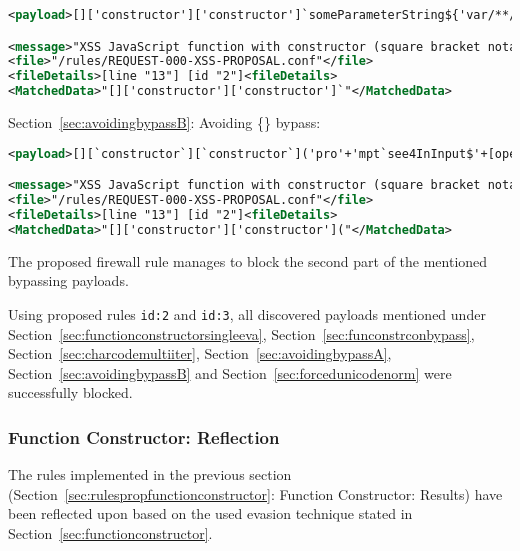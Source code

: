 \begin{lstlisting}[style=ruleStyle, language=XML, caption={Avoiding () bypass blocked}]
<payload>[]['constructor']['constructor']`someParameterString${'var/**/s/**/=/**/"secret";promp'+'t`s\\u{0024}{s}`'}```</payload>

<message>"XSS JavaScript function with constructor (square bracket notation)"</message>
<file>"/rules/REQUEST-000-XSS-PROPOSAL.conf"</file>
<fileDetails>[line "13"] [id "2"]<fileDetails>
<MatchedData>"[]['constructor']['constructor']`"</MatchedData>
\end{lstlisting}

Section~\ref{sec:avoidingbypassB}: Avoiding \{\} bypass:

\begin{lstlisting}[style=ruleStyle, language=XML, caption={Avoiding \{\} bypass blocked}]
<payload>[][`constructor`][`constructor`]('pro'+'mpt`see4InInput$'+[open+[]][0][16]+'2+2'+[open+[]][0][36]+':`')()</payload>

<message>"XSS JavaScript function with constructor (square bracket notation)"</message>
<file>"/rules/REQUEST-000-XSS-PROPOSAL.conf"</file>
<fileDetails>[line "13"] [id "2"]<fileDetails>
<MatchedData>"[]['constructor']['constructor']("</MatchedData>
\end{lstlisting}

The proposed firewall rule manages to block the second part of the mentioned bypassing payloads.

Using proposed rules \verb|id:2| and \verb|id:3|, all discovered payloads mentioned under Section~\ref{sec:functionconstructorsingleeva}, Section~\ref{sec:funconstrconbypass}, Section~\ref{sec:charcodemultiiter}, Section~\ref{sec:avoidingbypassA}, Section~\ref{sec:avoidingbypassB} and Section~\ref{sec:forcedunicodenorm} were successfully blocked.


\subsubsection{Function Constructor: Reflection}
\label{sec:rulespropfunctionconstructorreflection}
The rules implemented in the previous section (Section~\ref{sec:rulespropfunctionconstructor}: Function Constructor: Results) have been reflected upon based on the used evasion technique stated in Section~\ref{sec:functionconstructor}.


